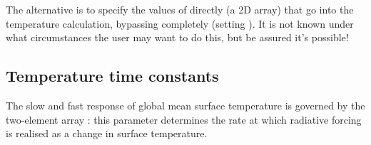 \documentclass[letterpaper,10pt,english]{sphinxmanual}
\begin{document}
\noindent{}

The alternative is to specify the values of  directly (a 2D array)
that go into the temperature calculation, bypassing 
completely (setting ). It is not known under what
circumstances the user may want to do this, but be assured it's
possible!

\begin{sphinxVerbatim}[commandchars=\\\{\}]
    
\PYG{p}{[}\PYG{p}{]}  

  
\PYG{p}{[}\PYG{p}{]}  
\PYG{p}{[}\PYG{p}{]}  
  
 \PYG{p}{[}\PYG{p}{]} \PYG{p}{[}\PYG{p}{]} \PYG{p}{[}\PYG{p}{]}
\end{sphinxVerbatim}

\begin{sphinxVerbatim}[commandchars=\\\{\}]
  
\end{sphinxVerbatim}


\subsection{Temperature time constants}
\label{\detokenize{examples:temperature-time-constants}}
The slow and fast response of global mean surface temperature is
governed by the two-element array : this parameter determines the
rate at which radiative forcing is \sphinxquotedblleft{}realised\sphinxquotedblright{} as a change in surface
temperature.
\end{document}
